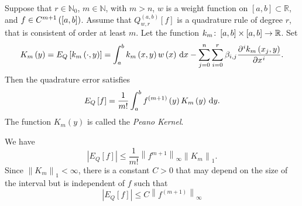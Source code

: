 \begin{frame}


    \begin{theorem}
        Suppose that $r\in\mathbb{N}_{0}$, $m\in\mathbb{N}$, with $m>n$,
        $w$ is a weight function on $\left[a,b\right]\subset\mathbb{R}$, and
        $f\in C^{m+1}\left(\left[a,b\right]\right)$.
        Assume that
        \begin{math}
            Q^{\left(a,b\right)}_{w,r}
            \left[f\right]
        \end{math}
        is a quadrature rule of degree $r$,
        that is consistent of order at least $m$.
        Let the function
        \begin{math}
            k_{m}\colon\left[a,b\right]\times\left[a,b\right]\to\mathbb{R}
        \end{math}.
        Set
        \begin{equation*}
            K_{m}\left(y\right)=
            E_{Q}\left[k_{m}\left(\cdot, y\right)\right]=
            \int_{a}^{b}
            k_{m}\left(x,y\right)w\left(x\right)\dl x-
            \sum_{j=0}^{n}
            \sum_{i=0}^{r}
            \beta_{i,j}
            \diffp[i]{k_{m}\left(x_{j},y\right)}{x}.
        \end{equation*}
        Then the quadrature error satisfies
        \begin{equation*}
            E_{Q}\left[f\right]=
            \dfrac{1}{m!}
            \int_{a}^{b}
            f^{\left(m+1\right)}\left(y\right)
            K_{m}\left(y\right)
            \dl y.
        \end{equation*}
        The function $K_{m}\left(y\right)$ is called the \emph{Peano Kernel}.
    \end{theorem}

    \begin{theorem}
        We have
        \begin{equation*}
            \left|
            E_{Q}
            \left[f\right]
            \right|\leq
            \dfrac{1}{m!}
            {\left\|
                f^{m+1}
                \right\|}_{\infty}
            {\left\|
                K_{m}
                \right\|}_{1}.
        \end{equation*}
        Since ${\left\|K_{m}\right\|}_{1}<\infty$, there is a
        constant $C>0$ that may depend on the size of the interval
        but is independent of $f$ such that
        \begin{equation*}
            \left|
            E_{Q}
            \left[f\right]
            \right|\leq
            C{\left\|
                    f^{\left(m+1\right)}
                    \right\|}_{\infty}
        \end{equation*}
    \end{theorem}
\end{frame}

